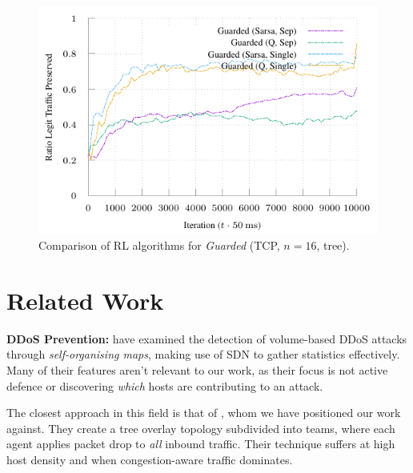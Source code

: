 \documentclass[10pt, times, conference, letterpaper]{IEEEtran}
\newcommand{\fakepara}[1]{\noindent\textbf{#1:}}
\begin{document}
\begin{figure}
	\centering
	\includegraphics[width=0.75\linewidth]{../plots/tnsm-algo-spf-tcp}
	\vspace{-1em}
	\caption{
		Comparison of RL algorithms for \emph{Guarded} (TCP, $n=16$, tree).
		\label{fig:algo-spf-tcp}
	}
\vspace{-1em}
\end{figure}

\section{Related Work}\label{sec:related-work}


\fakepara{DDoS Prevention}
\Textcite{DBLP:conf/lcn/BragaMP10} have examined the detection of volume-based DDoS attacks through \emph{self-organising maps}, making use of SDN to gather statistics effectively.
Many of their features aren't relevant to our work, as their focus is not active defence or discovering \emph{which} hosts are contributing to an attack.

The closest approach in this field is that of \textcite{DBLP:journals/eaai/MalialisK15}, whom we have positioned our work against.
They create a tree overlay topology subdivided into teams, where each agent applies packet drop to \emph{all} inbound traffic.
Their technique suffers at high host density and when congestion-aware traffic dominates.
\end{document}
